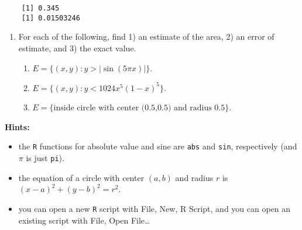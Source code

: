 \documentclass[10pt,english]{article}
\begin{document}
\begin{verbatim}
    [1] 0.345
    [1] 0.01503246
\end{verbatim}



\begin{enumerate}
\item For each of the following, find 1) an estimate of the area, 2) an error of estimate, and 3) the exact value.
\begin{enumerate}
\item \( E = \{ (x,y) : y > |\sin(5 \pi x)| \} \).
\item \( E = \{ (x,y) : y < 1024 x^5 (1-x)^5 \} \).
\item \( E = \{ \mbox{inside circle with center (0.5,0.5) and radius 0.5}\} \).
\end{enumerate}
\end{enumerate}
\textbf{Hints:}

\begin{itemize}
\item the \texttt{R} functions for absolute value and sine are \texttt{abs} and \texttt{sin}, respectively (and $\pi$ is just \texttt{pi}).
\item the equation of a circle with center \( (a,b) \) and radius $r$ is \( (x-a)^{2} + (y-b)^{2} = r^{2} \).
\item you can open a new \texttt{R} script with File, New, R Script, and you can open an existing script with File, Open File\ldots{}
\end{itemize}
\end{document}
